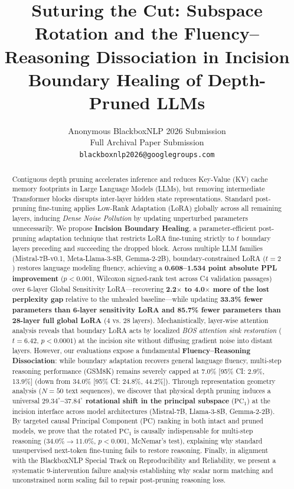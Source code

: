 \documentclass[11pt]{article}
\title{Suturing the Cut: Subspace Rotation and the Fluency--Reasoning Dissociation in Incision Boundary Healing of Depth-Pruned LLMs}
\author{
  Anonymous BlackboxNLP 2026 Submission \\
  Full Archival Paper Submission \\
  \texttt{blackboxnlp2026@googlegroups.com}
}
\begin{document}
\maketitle

\begin{abstract}
Contiguous depth pruning accelerates inference and reduces Key-Value (KV) cache memory footprints in Large Language Models (LLMs), but removing intermediate Transformer blocks disrupts inter-layer hidden state representations. Standard post-pruning fine-tuning applies Low-Rank Adaptation (LoRA) globally across all remaining layers, inducing \textit{Dense Noise Pollution} by updating unperturbed parameters unnecessarily. We propose \textbf{Incision Boundary Healing}, a parameter-efficient post-pruning adaptation technique that restricts LoRA fine-tuning strictly to $t$ boundary layers preceding and succeeding the dropped block. Across multiple LLM families (Mistral-7B-v0.1, Meta-Llama-3-8B, Gemma-2-2B), boundary-constrained LoRA ($t=2$) restores language modeling fluency, achieving a \textbf{0.608--1.534 point absolute PPL improvement} ($p < 0.001$, Wilcoxon signed-rank test across C4 validation passages) over 6-layer Global Sensitivity LoRA---recovering \textbf{2.2$\times$ to 4.0$\times$ more of the lost perplexity gap} relative to the unhealed baseline---while updating \textbf{33.3\% fewer parameters than 6-layer sensitivity LoRA and 85.7\% fewer parameters than 28-layer full global LoRA} (4 vs. 28 layers). Mechanistically, layer-wise attention analysis reveals that boundary LoRA acts by localized \textit{BOS attention sink restoration} ($t = 6.42$, $p < 0.0001$) at the incision site without diffusing gradient noise into distant layers. However, our evaluations expose a fundamental \textbf{Fluency--Reasoning Dissociation}: while boundary adaptation recovers general language fluency, multi-step reasoning performance (GSM8K) remains severely capped at 7.0\% [95\% CI: 2.9\%, 13.9\%] (down from 34.0\% [95\% CI: 24.8\%, 44.2\%]). Through representation geometry analysis ($N=50$ text sequences), we discover that physical depth pruning induces a universal \textbf{$29.34^\circ$--$37.84^\circ$ rotational shift in the principal subspace} ($\mathrm{PC}_1$) at the incision interface across model architectures (Mistral-7B, Llama-3-8B, Gemma-2-2B). By targeted causal Principal Component (PC) ranking in both intact and pruned models, we prove that the rotated $\mathrm{PC}_1$ is causally indispensable for multi-step reasoning ($34.0\% \!\to\! 11.0\%$, $p < 0.001$, McNemar's test), explaining why standard unsupervised next-token fine-tuning fails to restore reasoning. Finally, in alignment with the BlackboxNLP Special Track on Reproducibility and Reliability, we present a systematic 9-intervention failure analysis establishing why scalar norm matching and unconstrained norm scaling fail to repair post-pruning reasoning loss.
\end{abstract}
\end{document}
